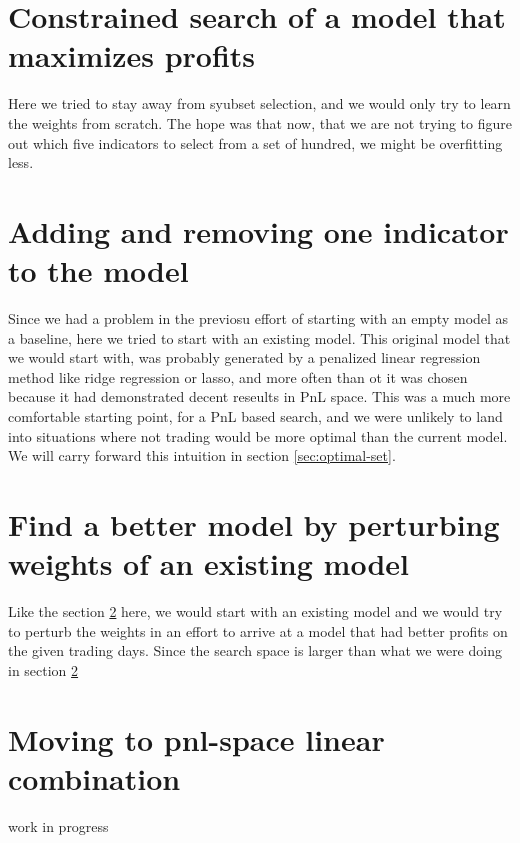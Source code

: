\documentclass[a4paper]{article}
\begin{document}
\section{Constrained search of a model that maximizes profits}
\label{sec:ankit-work2}
Here we tried to stay away from syubset selection, and we would only
try to learn the weights from scratch. The hope was that now, that we
are not trying to figure out which five indicators to select from a
set of hundred, we might be overfitting less.

\section{Adding and removing one indicator to the model}
\label{sec:aim}
Since we had a problem in the previosu effort of starting with an
empty model as a baseline, here we tried to start with an existing
model. This original model that we would start with, was probably generated by a penalized linear
regression method like ridge regression or lasso, and more often than
ot it was chosen because it had demonstrated decent reseults in PnL
space. This was a much more comfortable starting point, for a PnL
based search, and we were unlikely to land into situations where not
trading would be more optimal than the current model. We will carry
forward this intuition in section \ref{sec:optimal-set}.

\section{Find a better model by perturbing weights of an existing
  model}
\label{sec:fbmfs}
Like the section \ref{sec:aim} here, we would start with an existing
model and we would try to perturb the weights in an effort to arrive
at a model that had better profits on the given trading days. Since
the search space is larger than what we were doing in section \ref{sec:aim}

\section{Moving to pnl-space linear combination}
\label{sec:vinit-work}
work in progress
\end{document}

